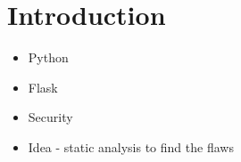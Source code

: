 \chapter{Introduction}\label{ch:introduction}
\begin{itemize}
\item Python
\item Flask
\item Security
\item Idea - static analysis to find the flaws
\end{itemize}
